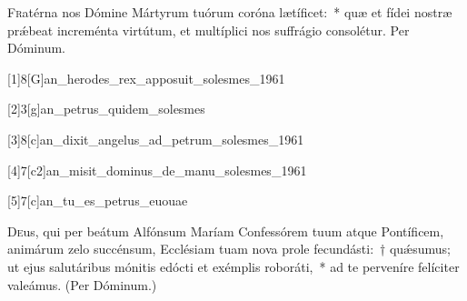 \documentclass[vesperale_romanum.tex]{subfiles}
\begin{document}
\hicvir


\oratio

\lettrine{F}{r}atérna nos Dómine Mártyrum tuórum coróna lætíficet:~* quæ et fídei nostræ prǽbeat increménta virtútum, et multíplici nos suffrágio consolétur.
Per Dóminum.



[1]{8}[G]{an_herodes_rex_apposuit_solesmes_1961}
\label{109_8G_aug} 
{}

[2]{3}[g]{an_petrus_quidem_solesmes}

[3]{8}[c]{an_dixit_angelus_ad_petrum_solesmes_1961}
 
[4]{7}[c2]{an_misit_dominus_de_manu_solesmes_1961}

[5]{7}[c]{an_tu_es_petrus_euouae}





\newpage
\myrule

\duplex


\oratio

\lettrine{D}{e}us, qui per beátum Alfónsum Maríam Confessórem tuum atque Pontíficem, animárum zelo succénsum, Ecclésiam tuam nova prole fecundásti:~† quǽsumus; ut ejus salutáribus mónitis edócti et exémplis roboráti,~* ad te perveníre felíciter valeámus. (Per Dóminum.)
\end{document}
